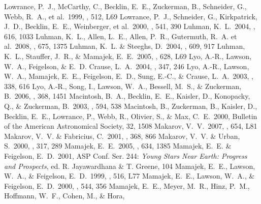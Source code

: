 \documentclass[11pt,twoside]{book}
\begin{document}
\begin{thebibliography}{}
Lowrance, P.~J.,  {McCarthy}, C.,  {Becklin}, E.~E., {Zuckerman}, B.,
{Schneider}, G., {Webb}, R.~A.,
et al.\ 1999, \apjl, 512, L69
{Lowrance}, P.~J., {Schneider}, G., {Kirkpatrick}, J.~D., {Becklin}, E.~E.,
{Weinberger},
et al.\ 2000, \apj, 541, 390
Luhman, K.~L.\ 2004, \apj, 616, 1033
Luhman, K.~L., Allen, L.~E., Allen, P.~R., Gutermuth, R.~A. et al.\ 2008, \apj, 675, 1375
Luhman, K.~L. \& Steeghs, D.\ 2004, \apj, 609, 917
Luhman, K.~L., Stauffer, J.~R., \& Mamajek, E.~E.\ 2005, \apjl, 628, L69
Lyo, A.-R., Lawson, W.~A., Feigelson, \& E.~D.  Crause, L.~A.\ 2004, \mnras,
347, 246
Lyo, A.-R., Lawson, W.~A., Mamajek, E.~E., Feigelson, E.~D., Sung, E.-C., \&
Crause, L.~A.\ 2003, \mnras, 338, 616
Lyo, A.-R., Song, I., Lawson, W.~A., Bessell, M.~S., \& Zuckerman, B.\ 2006,
\mnras, 368, 1451
Macintosh, B.~A., Becklin, E.~E., Kaisler, D., Konopacky, Q., \& Zuckerman, B.\
2003, \apj, 594, 538
Macintosh, B., Zuckerman, B., Kaisler, D., Becklin, E.~E., Lowrance, P., Webb,
R., Olivier, S., \& Max, C.~E.\ 2000, Bulletin of the American Astronomical
Society, 32, 1508
Makarov, V.~V.\ 2007, \apjl, 654, L81
Makarov, V.~V. \& Fabricius, C.\ 2001, \aap, 368, 866
Makarov, V.~V. \& Urban, S.\ 2000, \mnras, 317, 289
Mamajek, E.~E.\ 2005, \apj, 634, 1385
{Mamajek}, E.~E. \& {Feigelson}, E.~D.\ 2001, ASP Conf. Ser. 244: {\it Young
Stars Near Earth: Progress and Prospects}, ed. R. {Jayawardhana} \& T. {Greene}, {104}
\bibitem[Mamajek et al.(1999)]{mamajek99}
Mamajek, E.~E., Lawson, W.~A., \& Feigelson, E.~D.\ 1999, \apjl, 516, L77
\bibitem[Mamajek et al.(2000)]{mamajek00}
Mamajek, E.~E., Lawson, W.~A., \& Feigelson, E.~D.\ 2000, \apj, 544, 356
\bibitem[Mamajek et al.(2004)]{mamajek04}
Mamajek, E.~E., Meyer,  M.~R., Hinz, P.~M., Hoffmann, W.~F., Cohen, M., \& Hora,

\end{thebibliography}
\end{document}
